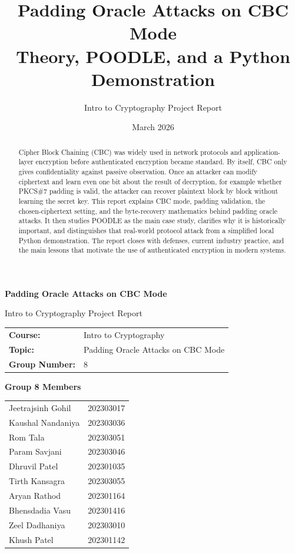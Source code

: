 \documentclass[12pt,a4paper]{article}
\title{Padding Oracle Attacks on CBC Mode\\\large Theory, POODLE, and a Python Demonstration}
\author{Intro to Cryptography Project Report}
\date{March 2026}
\begin{document}
\hypersetup{pageanchor=false}
\begin{titlepage}
    \centering
    \vspace*{2.8cm}
    {\Huge \bfseries Padding Oracle Attacks on CBC Mode\par}
    \vspace{2cm}

    {\large Intro to Cryptography Project Report\par}
    \vspace{1.2cm}

    \begin{tabular}{ll}
        \textbf{Course:} & Intro to Cryptography \\
        \textbf{Topic:} & Padding Oracle Attacks on CBC Mode \\
        \textbf{Group Number:} & 8 \\
    \end{tabular}

    \vspace{1.2cm}

    {\large \textbf{Group 8 Members}\par}
    \vspace{0.5cm}

    \begin{tabular}{ll}
        Jeetrajsinh Gohil & 202303017 \\
        Kaushal Nandaniya & 202303036 \\
        Rom Tala & 202303051 \\
        Param Savjani & 202303046 \\
        Dhruvil Patel & 202301035 \\
        Tirth Kansagra & 202303055 \\
        Aryan Rathod & 202301164 \\
        Bhensdadia Vasu & 202301416 \\
        Zeel Dadhaniya & 202303010 \\
        Khush Patel & 202301142 \\
    \end{tabular}
\end{titlepage}
\hypersetup{pageanchor=true}

\begin{abstract}
Cipher Block Chaining (CBC) was widely used in network protocols and application-layer encryption before authenticated encryption became standard. By itself, CBC only gives confidentiality against passive observation. Once an attacker can modify ciphertext and learn even one bit about the result of decryption, for example whether PKCS\#7 padding is valid, the attacker can recover plaintext block by block without learning the secret key. This report explains CBC mode, padding validation, the chosen-ciphertext setting, and the byte-recovery mathematics behind padding oracle attacks. It then studies POODLE as the main case study, clarifies why it is historically important, and distinguishes that real-world protocol attack from a simplified local Python demonstration. The report closes with defenses, current industry practice, and the main lessons that motivate the use of authenticated encryption in modern systems.
\end{abstract}
\end{document}
